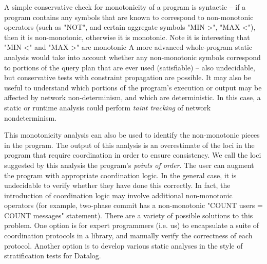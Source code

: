 A simple conservative check for monotonicity of a program is syntactic -- if a
program contains any symbols that are known to correspond to non-monotonic
operators (such as "NOT", and certain aggregate symbols "MIN >", "MAX <"), then
it is non-monotonic, otherwise it is monotonic.  Note it is interesting that
"MIN <" and "MAX >" are monotonic   A more advanced
whole-program static analysis would take into account whether any non-monotonic
symbols correspond to portions of the query plan that are ever used
(satisfiable) -- also undecidable, but conservative tests with constraint
propagation are possible.  It may also be useful to understand which portions
of the program's execution or output may be affected by network
non-determinism, and which are deterministic.  In this case, a static or
runtime analysis could perform {\em taint tracking} of network nondeterminism.

This monotonicity analysis can also be used to identify the non-monotonic
pieces in the program.  The output of this analysis is an overestimate of the
loci in the program that require coordination in order to ensure consistency.
We call the loci suggested by this analysis the program's {\em points of
order}.  The user can augment the program with appropriate coordination logic.
In the general case, it is undecidable to verify whether they have done this
correctly.  In fact, the introduction of coordination logic may involve
additional non-monotonic operators (for example, two-phase commit has a
non-monotonic "COUNT users = COUNT messages" statement).  There are a variety
of possible solutions to this problem.  One option is for expert programmers
(i.e. us) to encapsulate a suite of coordination protocols in a library, and
manually verify the correctness of each protocol.  Another option is to develop
various static analyses in the style of stratification tests for Datalog.

    

